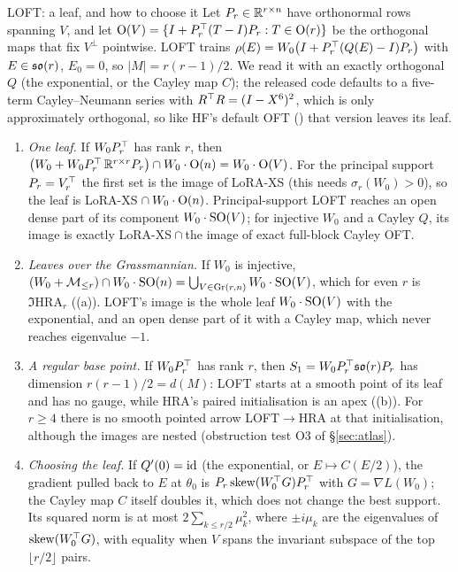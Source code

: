 \begin{example*}{LOFT: a leaf, and how to choose it}
Let $P_r\in\mathbb{R}^{r\times n}$ have orthonormal rows spanning $V$, and let $\mathrm{O}(V)=\{I+P_r^{\top}(T-I)P_r:T\in\mathrm{O}(r)\}$ be the
orthogonal maps that fix $V^\perp$ pointwise. LOFT trains $\rho(E)=W_0\big(I+P_r^{\top}(Q(E)-I)P_r\big)$ with $E\in\mathfrak{so}(r)$,
$E_0=0$, so $\lvert M\rvert=r(r-1)/2$. We read it with an exactly orthogonal $Q$ (the exponential, or the Cayley map
$C$); the released code defaults to a five-term Cayley--Neumann series with $R^{\top} R=(I-X^6)^2$, which is only
approximately orthogonal, so like HF's default OFT () that version leaves its leaf.
\begin{enumerate}[label=(\alph*)]
  \item \emph{One leaf.} If $W_0P_r^{\top}$ has rank $r$, then
    $\big(W_0+W_0P_r^{\top}\,\mathbb{R}^{r\times r}P_r\big)\cap W_0\cdot\mathrm{O}(n)=W_0\cdot\mathrm{O}(V)$. For the principal support
    $P_r=V_r^{\top}$ the first set is the image of LoRA-XS (this needs $\sigma_r(W_0)>0$), so the leaf is
    LoRA-XS${}\cap W_0\cdot\mathrm{O}(n)$. Principal-support LOFT reaches an open dense part of its component $W_0\cdot\mathrm{SO}(V)$;
    for injective $W_0$ and a Cayley $Q$, its image is exactly LoRA-XS${}\cap{}$the image of exact full-block Cayley
    OFT.
  \item \emph{Leaves over the Grassmannian.} If $W_0$ is injective,
    $(W_0+\mathcal{M}_{\le r})\cap W_0\cdot\mathrm{SO}(n)=\bigcup_{V\in\operatorname{Gr}(r,n)}W_0\cdot\mathrm{SO}(V)$, which for even $r$ is $\Im\mathrm{HRA}_r$
    ((a)). LOFT's image is the whole leaf $W_0\cdot\mathrm{SO}(V)$ with the exponential, and an open dense
    part of it with a Cayley map, which never reaches eigenvalue $-1$.
  \item \emph{A regular base point.} If $W_0P_r^{\top}$ has rank $r$, then $S_1=W_0P_r^{\top}\mathfrak{so}(r)P_r$ has dimension
    $r(r-1)/2=d(M)$: LOFT starts at a smooth point of its leaf and has no gauge, while HRA's paired initialisation is an
    apex ((b)). For $r\ge4$ there is no smooth pointed arrow LOFT${}\to{}$HRA at that
    initialisation, although the images are nested (obstruction test O3 of \S\ref{sec:atlas}).
  \item \emph{Choosing the leaf.} If $Q'(0)=\mathrm{id}$ (the exponential, or $E\mapsto C(E/2)$), the gradient pulled back to $E$
    at $\theta_0$ is $P_r\operatorname{skew}(W_0^{\top} G)P_r^{\top}$ with $G=\nabla L(W_0)$; the Cayley map $C$ itself doubles it, which does
    not change the best support. Its squared norm is at most $2\sum_{k\le r/2}\mu_k^2$, where $\pm i\mu_k$ are the
    eigenvalues of $\operatorname{skew}(W_0^{\top} G)$, with equality when $V$ spans the invariant subspace of the top $\lfloor r/2\rfloor$
    pairs.
\end{enumerate}
\end{example*}

